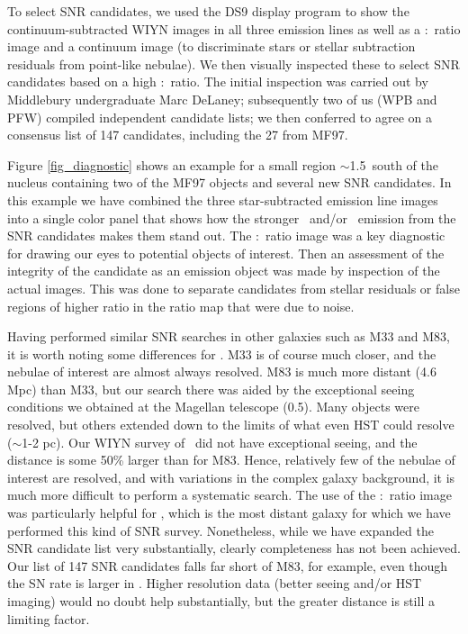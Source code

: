 

To select SNR candidates, we used the DS9 display program to show the continuum-subtracted WIYN images in all three emission lines as well as a \sii:\ha\ ratio image and a continuum image (to discriminate stars or stellar subtraction residuals from point-like nebulae).   We then visually inspected these to select SNR candidates based on a high \sii:\ha\ ratio.  The initial inspection was carried out by Middlebury undergraduate Marc DeLaney; subsequently two of us (WPB and PFW) compiled independent candidate lists; we then conferred to agree on a consensus list of 147 candidates, including the 27 from MF97.   

Figure \ref{fig_diagnostic} shows an example for a small region $\sim$1.5\arcmin\ south of the nucleus containing two of the MF97 objects and several new SNR candidates. In this example we have combined the three star-subtracted emission line images into a single color panel that shows how the stronger \sii\ and/or \oiii\ emission from the SNR candidates makes them stand out.  The \sii:\ha\ ratio image was a key diagnostic for drawing our eyes to potential objects of interest. Then an assessment of the integrity of the candidate as an emission object was made by inspection of the actual images.  This was done to separate candidates from stellar residuals or false regions of higher ratio in the ratio map that were due to noise.

Having performed similar SNR searches in other galaxies such as M33 and M83, it is worth noting some differences for \gal.  M33 is of course much closer, and the nebulae of interest are almost always resolved.  M83 is much more distant (4.6 Mpc) than M33, but our search there was aided by the exceptional seeing conditions we obtained at the Magellan telescope (0.5\arcsec).  Many objects were resolved, but others extended down to the limits of what even HST could resolve ($\sim$1-2 pc).  Our WIYN survey of \gal\ did not have exceptional seeing, and the distance is some 50\% larger than for M83.  Hence, relatively few of the nebulae of interest are resolved, and with variations in the complex galaxy background, it is much more difficult to perform a systematic search.  The use of the \sii:\ha\ ratio image was particularly helpful for \gal, which is the most distant galaxy for which we have performed this kind of SNR survey. Nonetheless, while we have expanded the SNR candidate list very substantially, clearly completeness has not been achieved.  Our list of 147 SNR candidates falls far short of M83, for example, even though the SN rate is larger in \gal.  Higher resolution data (better seeing and/or HST imaging) would no doubt help substantially, but the greater distance is still a limiting factor.

